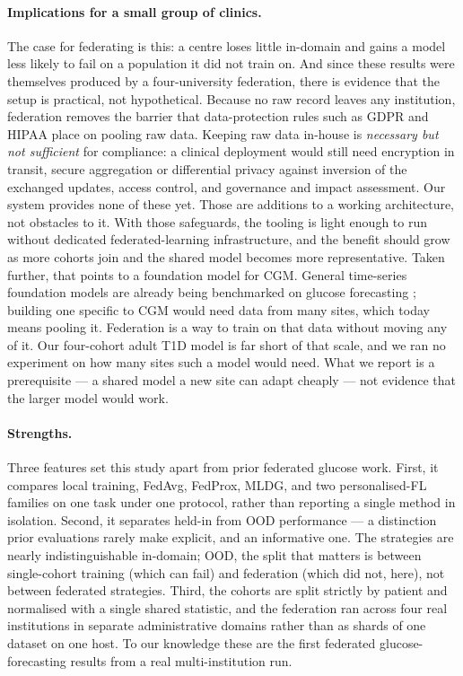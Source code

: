 \documentclass[10pt,letterpaper]{article}
\begin{document}
\paragraph{Implications for a small group of clinics.} The case for
federating is this: a centre loses little in-domain and gains a model less
likely to fail on a population it did not train on. And since these results were themselves produced by a
four-university federation, there is evidence that the setup is practical,
not hypothetical. Because no raw record leaves any institution, federation
removes the barrier that data-protection rules such as GDPR and HIPAA place
on pooling raw data. Keeping raw data in-house is \emph{necessary but not
sufficient} for compliance: a clinical deployment would still need encryption
in transit, secure aggregation or differential privacy against inversion of
the exchanged updates, access control, and governance and impact assessment.
Our system provides none of these yet. Those are additions to a working
architecture, not obstacles to it. With those safeguards, the tooling is
light enough to run without dedicated federated-learning infrastructure, and
the benefit should grow as more cohorts join and the shared model becomes
more representative. Taken further, that points to a foundation model for
CGM. General time-series foundation models are already being benchmarked on
glucose forecasting \cite{lu2026glucofmbench}; building one specific to CGM
would need data from many sites, which today means pooling it. Federation is
a way to train on that data without moving any of it. Our four-cohort adult
T1D model is far short of that scale, and we ran no experiment on how many
sites such a model would need. What we report is a prerequisite --- a shared
model a new site can adapt cheaply --- not evidence that the larger model
would work.

\paragraph{Strengths.} Three features set this study apart from prior
federated glucose work. First, it compares local training, FedAvg, FedProx,
MLDG, and two personalised-FL families on one task under one protocol, rather
than reporting a single method in isolation. Second, it separates held-in
from OOD performance --- a distinction prior evaluations rarely make
explicit, and an informative one. The strategies are nearly indistinguishable
in-domain; OOD, the split that matters is between single-cohort training
(which can fail) and federation (which did not, here), not between federated
strategies. Third, the cohorts are split strictly by patient and normalised
with a single shared statistic, and the federation ran across four real
institutions in separate administrative domains rather than as shards of one
dataset on one host. To our knowledge these are the first federated
glucose-forecasting results from a real multi-institution run.
\end{document}
